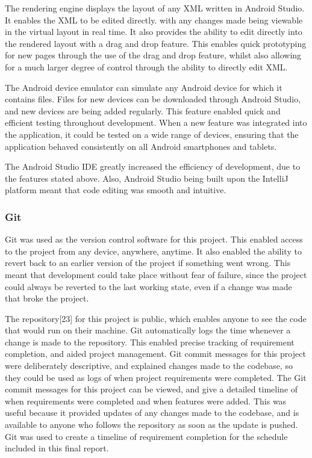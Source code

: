 \documentclass{article}
\begin{document}
The rendering engine displays the layout of any XML written in Android Studio. It enables the XML to be edited directly. with any changes made being viewable in the virtual layout in real time. It also provides the ability to edit directly into the rendered layout with a drag and drop feature. This enables quick prototyping for new pages through the use of the drag and drop feature, whilst also allowing for a much larger degree of control through the ability to directly edit XML. \par

The Android device emulator can simulate any Android device for which it contains files. Files for new devices can be downloaded through Android Studio, and new devices are being added regularly. This feature enabled quick and efficient testing throughout development. When a new feature was integrated into the application, it could be tested on a wide range of devices, ensuring that the application behaved consistently on all Android smartphones and tablets. \par

The Android Studio IDE greatly increased the efficiency of development, due to the features stated above. Also, Android Studio being built upon the IntelliJ platform meant that code editing was smooth and intuitive. \par

\subsubsection{Git}

Git was used as the version control software for this project. This enabled access to the project from any device, anywhere, anytime. It also enabled the ability to revert back to an earlier version of the project if something went wrong. This meant that development could take place without fear of failure, since the project could always be reverted to the last working state, even if a change was made that broke the project. \par

The repository[23] for this project is public, which enables anyone to see the code that would run on their machine. Git automatically logs the time whenever a change is made to the repository. This enabled precise tracking of requirement completion, and aided project management. Git commit messages for this project were deliberately descriptive, and explained changes made to the codebase, so they could be used as logs of when project requirements were completed. The Git commit messages for this project can be viewed, and give a detailed timeline of when requirements were completed and when features were added. This was useful because it provided updates of any changes made to the codebase, and is available to anyone who follows the repository as soon as the update is pushed. Git was used to create a timeline of requirement completion for the schedule included in this final report. \par
\end{document}

